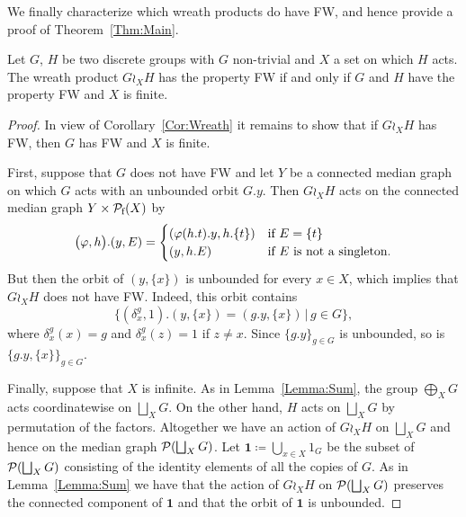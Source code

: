 We finally characterize which wreath products do have FW, and hence provide a proof of Theorem~\ref{Thm:Main}.
\begin{prop}\label{Prop:Median}
Let $G$, $H$ be two discrete groups with $G$ non-trivial and $X$ a set on which $H$ acts. The wreath product $G \wr_X H$ has the property FW if and only if $G$ and $H$ have the property FW and $X$ is finite.
\end{prop}
\begin{proof}
In view of Corollary~\ref{Cor:Wreath} it remains to show that if $G\wr_X H$ has FW, then $G$ has FW and $X$ is finite.

First, suppose that $G$ does not have FW and let $Y$ be a connected median graph on which $G$ acts with an unbounded orbit $G.y$.
Then $G\wr_X H$ acts on the connected median graph $Y\times \powersetf{X}$ by
\[
	\bigl(\phi,h\bigr).(y,E)=
	\begin{cases}
	(\phi(h.t).y,h.\{t\})&\textnormal{if $E=\{t\}$}\\
	(y,h.E)&\textnormal{if $E$ is not a singleton.}
	\end{cases}
\]
But then the orbit of $(y,\{x\})$ is unbounded for every $x\in X$, which implies that $G\wr_X H$ does not have FW.
Indeed, this orbit contains
\[
	\{(\delta_{x}^g,1).(y,\{x\})=(g.y,\{x\})\,|\,g\in G\},
\]
where $\delta_{x}^g(x)=g$ and $\delta_{x}^g(z)=1$ if $z\neq x$.
Since $\{g.y\}_{g\in G}$ is unbounded, so is $\{g.y,\{x\}\}_{g\in G}$.

Finally, suppose that $X$ is infinite.
As in Lemma~\ref{Lemma:Sum}, the group $\bigoplus_XG$ acts coordinatewise on  $\bigsqcup_XG$. On the other hand, $H$ acts on $\bigsqcup_XG$ by permutation of the factors.
Altogether we have an action of $G\wr_XH$ on $\bigsqcup_XG$ and hence on the median graph $\powerset{\bigsqcup_XG}$.
Let $\mathbf 1\coloneqq\bigcup_{x\in X} 1_{G}$ be the subset of $\powerset{\bigsqcup_XG}$ consisting of the identity elements of all the copies of $G$.
As in Lemma~\ref{Lemma:Sum} we have that the action of $G\wr_XH$ on $\powerset{\bigsqcup_XG}$ preserves the connected component of $\mathbf 1$
and that the orbit of $\mathbf 1$ is unbounded.
\end{proof}

